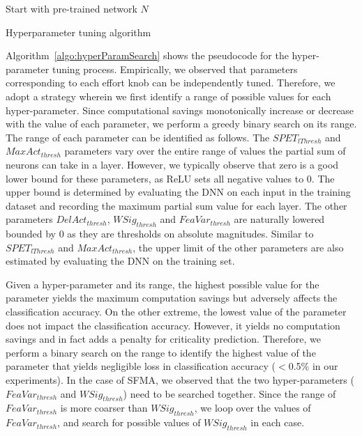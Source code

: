 \documentclass{article} %
\begin{document}
\begin{algorithm}[htb]
\SetAlgoLined
{}
 Start with pre-trained network $N$\;
\caption{Hyperparameter tuning algorithm}
\label{algo:hyperParamSearch}
\end{algorithm}

Algorithm~\ref{algo:hyperParamSearch} shows the pseudocode for the  hyper-parameter tuning process. Empirically, we observed that parameters corresponding to each effort knob can be independently tuned. Therefore, we adopt a strategy wherein we first identify a range of possible values for each hyper-parameter. Since computational savings monotonically increase or decrease with the value of each parameter, we perform a greedy binary search on its range. The range of each parameter can be identified as follows. The $SPET_{lThresh}$ and $MaxAct_{thresh}$ parameters vary over the entire range of values the partial sum of neurons can take in a layer. However, we typically observe that zero is a good lower bound for these parameters, as ReLU sets all negative values to 0. The upper bound is determined by evaluating the DNN on each input in the training dataset and recording the maximum partial sum value for each layer. The other parameters $DelAct_{thresh}$, $WSig_{thresh}$ and $FeaVar_{thresh}$ are naturally lowered bounded by 0 as they are thresholds on absolute magnitudes. Similar to $SPET_{lThresh}$ and $MaxAct_{thresh}$, the upper limit of the other parameters are also estimated by evaluating the DNN on the training set. 

Given a hyper-parameter and its range, the highest possible value for the parameter yields the maximum computation savings but adversely affects the classification accuracy. On the other extreme, the lowest value of the parameter does not impact the classification accuracy. However, it yields no computation savings and in fact adds a penalty for criticality prediction. Therefore, we perform a binary search on the range to identify the highest value of the parameter that yields negligible loss in classification accuracy ($<$0.5\% in our experiments). In the case of SFMA, we observed that the two hyper-parameters ($FeaVar_{thresh}$ and $WSig_{thresh}$) need to be searched together. Since the range of $FeaVar_{thresh}$ is more coarser than $WSig_{thresh}$, we loop over the values of $FeaVar_{thresh}$, and search for possible values of $WSig_{thresh}$ in each case.
\end{document}
